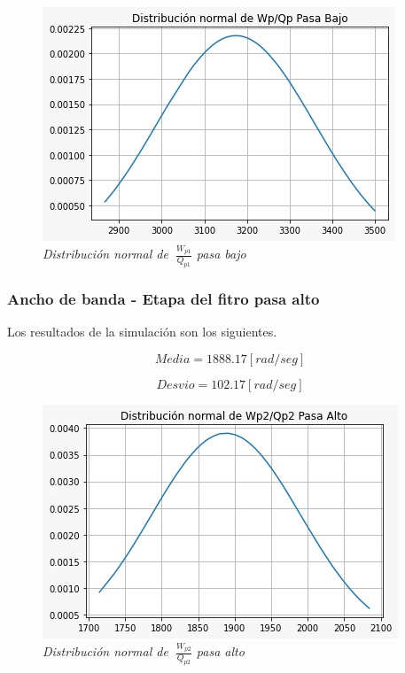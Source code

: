 \documentclass[12pt,A4paper,titlepage]{article}
\begin{document}
\begin{figure}[!h] 
  \centering
  \includegraphics[scale=0.7]{Imagenes/Distribución normal de Wp1Qp1 pasa bajo.png}
  \caption{\textit{Distribución normal de \(\ \frac{W_{p1}}{Q_{p1}}\) pasa bajo}}
\end{figure}

\subsubsection{Ancho de banda - Etapa del fitro pasa alto}
\hspace{1mm} Los resultados de la simulación son los siguientes.

\begin{equation}
    \boxed{Media = 1888.17 [rad/seg]}     
\end{equation}

\begin{equation}
    \boxed{Desvio = 102.17 [rad/seg]}
\end{equation}

\begin{figure}[!h] 
  \centering
  \includegraphics[scale=0.7]{Imagenes/Distribución normal de Wp2Qp2 pasa alto.png}
  \caption{\textit{Distribución normal de \(\ \frac{W_{p2}}{Q_{p2}}\) pasa alto}}
\end{figure}
\end{document}
